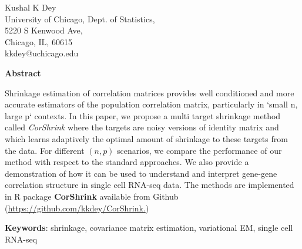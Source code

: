 \documentclass[a4paper, 12pt]{article}
\begin{document}
\begin{flushleft}
{\LARGE
\textbf{} 
}

Kushal K Dey \\
University of Chicago, Dept. of Statistics, \\
5220 S Kenwood Ave, \\
Chicago, IL, 60615 \\
kkdey@uchicago.edu \\
\end{flushleft}

\begin{center}
\textbf{Abstract} \\ \vspace{0.2 in}
\end{center}
\begin{flushleft}
{\small Shrinkage estimation of correlation matrices provides well conditioned and more accurate estimators of the population correlation matrix, particularly in `small n, large p` contexts. In this paper, we propose a multi target shrinkage method called \textit{CorShrink} where the targets are noisy versions of identity matrix and which learns adaptively the optimal amount of shrinkage to these targets from the data. For different $(n,p)$ scenarios, we compare the performance of our method with respect to the standard approaches. We also provide a demonstration of how it can be used to understand  and interpret gene-gene correlation structure in single cell RNA-seq data. The methods are implemented in R package \textbf{CorShrink}  available from Github (\url{https://github.com/kkdey/CorShrink.})} \\ \vspace{0.2 in}

\textbf{Keywords}: shrinkage, covariance matrix estimation, variational EM, single cell RNA-seq
\end{flushleft}

\normalsize



\end{document}
